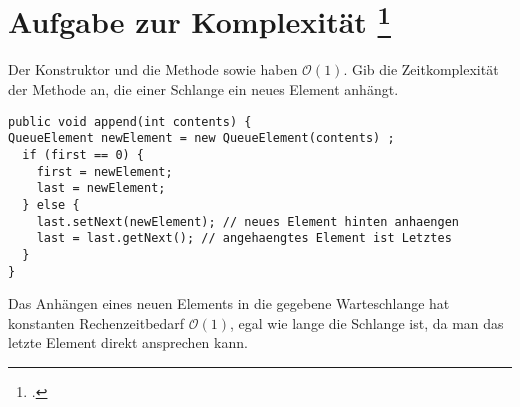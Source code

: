 \documentclass{lehramt-informatik-aufgabe}
\begin{document}

\section{Aufgabe zur Komplexität
\footcite[Seite 3]{aud:pu:2}}

\noindent
Der Konstruktor  und die Methode
 sowie  haben $\mathcal{O}(1)$.
Gib die Zeitkomplexität der Methode  an, die
einer Schlange ein neues Element anhängt.

\begin{verbatim}
public void append(int contents) {
QueueElement newElement = new QueueElement(contents) ;
  if (first == 0) {
    first = newElement;
    last = newElement;
  } else {
    last.setNext(newElement); // neues Element hinten anhaengen
    last = last.getNext(); // angehaengtes Element ist Letztes
  }
}
\end{verbatim}

\begin{antwort}
Das Anhängen eines neuen Elements in die gegebene Warteschlange hat
konstanten Rechenzeitbedarf $\mathcal{O}(1)$, egal wie lange die
Schlange ist, da man das letzte Element direkt ansprechen kann.
\end{antwort}
\end{document}
